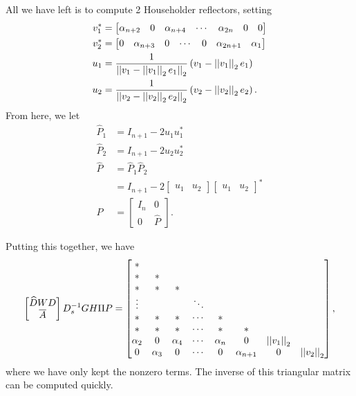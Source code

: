 All we have left is to compute 2 Householder reflectors, setting
%
\begin{align}
    v_{1}^{*} &= \begin{bmatrix} \alpha_{n+2} & 0 & \alpha_{n+4} & \cdots &
                \alpha_{2n} & 0 & 0 \end{bmatrix} \nonumber\\
    v_{2}^{*} &= \begin{bmatrix} 0 & \alpha_{n+3} & 0 & \cdots &
                0 & \alpha_{2n+1} & \alpha_{1} \end{bmatrix} \nonumber\\
    u_{1} &= \frac{1}{\left| \left| v_{1} - \left| \left| v_{1} \right| \right|_{2}e_{1} \right| \right|_{2}}
                \left( v_{1} - \left| \left| v_{1} \right| \right|_{2}e_{1} \right) \nonumber\\
    u_{2} &= \frac{1}{\left| \left| v_{2} - \left| \left| v_{2} \right| \right|_{2}e_{2} \right| \right|_{2}}
                \left( v_{2} - \left| \left| v_{2} \right| \right|_{2}e_{2} \right).
\end{align}
%
From here, we let
%
\begin{align}
    \widehat{P}_{1} &= I_{n+1} - 2u_{1}u_{1}^{*} \nonumber\\
    \widehat{P}_{2} &= I_{n+1} - 2u_{2}u_{2}^{*} \nonumber\\
    \widehat{P} &= \widehat{P}_{1}\widehat{P}_{2} \nonumber\\
        &= I_{n+1} - 2\begin{bmatrix} u_{1} & u_{2} \end{bmatrix}
                \begin{bmatrix} u_{1} & u_{2} \end{bmatrix}^{*} \nonumber\\
    P &= \begin{bmatrix} I_{n} & 0 \\ 0 & \widehat{P} \end{bmatrix}.
\end{align}

\noindent
Putting this together, we have
%
\begin{equation}
    \label{eq:CV_D_1D_2n_E_F1_L_even}
    \begin{bmatrix} \widehat{D}WD \\ \overline{A}\end{bmatrix}D_{s}^{-1}GH\Pi P
        = \begin{bmatrix}
            * & \\
            * & * & \\
            * & * & * & \\
            \vdots &   &   & \ddots \\
            * & * & * & \cdots & * & \\
            * & * & * & \cdots & * & * & \\
            \alpha_{2} & 0 & \alpha_{4} & \cdots & \alpha_{n} & 0 &
                \left| \left| v_{1} \right| \right|_{2} \\
            0 & \alpha_{3} & 0 & \cdots & 0 & \alpha_{n+1} &
                0 & \left| \left| v_{2} \right| \right|_{2} \\
            \end{bmatrix},
\end{equation}
%
where we have only kept the nonzero terms. The inverse of this triangular
matrix can be computed quickly.

